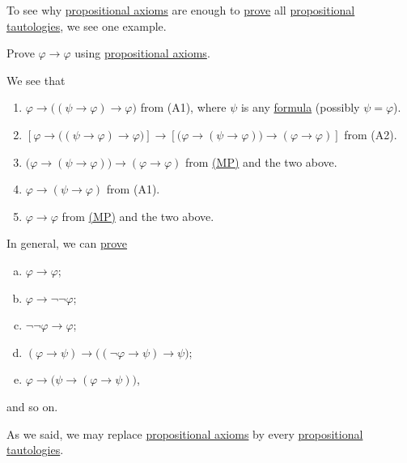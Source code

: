 To see why \hyperref[def:propositional-axioms]{propositional axioms} are enough to \hyperref[def:proof]{prove} all \hyperref[def:propositional-tautology]{propositional tautologies}, we see one example.

\begin{problem*}\label{prob:lec6}
	Prove \(\varphi \to \varphi \) using \hyperref[def:propositional-axioms]{propositional axioms}.
\end{problem*}
\begin{answer}
	We see that
	\begin{enumerate}
		\item \(\varphi \to  \big((\psi \to \varphi ) \to \varphi \big)\) from (A1), where \(\psi \) is any \hyperref[def:formula]{formula} (possibly \(\psi =\varphi \)).
		\item \(\left[ \varphi \to \big((\psi \to \varphi) \to \varphi \big) \right] \to  \left[ \big(\varphi \to (\psi \to \varphi )\big) \to (\varphi \to \varphi ) \right] \) from (A2).
		\item \(\big(\varphi \to (\psi \to \varphi )\big) \to (\varphi \to \varphi )\) from \hyperref[def:rule-of-inference]{(MP)} and the two above.
		\item \(\varphi \to (\psi \to \varphi )\) from (A1).
		\item \(\varphi \to \varphi \) from \hyperref[def:rule-of-inference]{(MP)} and the two above.
	\end{enumerate}
\end{answer}

In general, we can \hyperref[def:proof]{prove}
\begin{enumerate}[(a)]
	\item \(\varphi \to \varphi \);
	\item \(\varphi \to \lnot \lnot \varphi \);
	\item \(\lnot \lnot \varphi \to \varphi \);
	\item \((\varphi \to \psi ) \to  \big((\lnot \varphi \to \psi ) \to \psi \big)\);
	\item \(\varphi \to \big(\psi \to (\varphi \to \psi )\big)\),
\end{enumerate}
and so on.

\begin{note}
	As we said, we may replace \hyperref[def:propositional-axioms]{propositional axioms} by every \hyperref[def:propositional-tautology]{propositional tautologies}.
\end{note}

